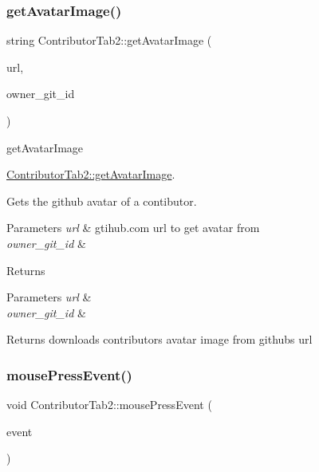 \subsubsection{\texorpdfstring{get\+Avatar\+Image()}{getAvatarImage()}}
{\footnotesize\ttfamily string Contributor\+Tab2\+::get\+Avatar\+Image (\begin{DoxyParamCaption}\item[{string}]{url,  }\item[{string}]{owner\+\_\+git\+\_\+id }\end{DoxyParamCaption})}



get\+Avatar\+Image 

\hyperlink{classContributorTab2_aed6aceb6bd6c0fb3d32e435a731133d8}{Contributor\+Tab2\+::get\+Avatar\+Image}.

Gets the github avatar of a contibutor. 
\begin{DoxyParams}{Parameters}
{\em url} & gtihub.\+com url to get avatar from \\
\hline
{\em owner\+\_\+git\+\_\+id} & \\
\hline
\end{DoxyParams}
\begin{DoxyReturn}{Returns}

\end{DoxyReturn}

\begin{DoxyParams}{Parameters}
{\em url} & \\
\hline
{\em owner\+\_\+git\+\_\+id} & \\
\hline
\end{DoxyParams}
\begin{DoxyReturn}{Returns}
downloads contributor\textquotesingle{}s avatar image from github\textquotesingle{}s url 
\end{DoxyReturn}
\mbox{\label{classContributorTab2_a93c3ed51e9f40c439ed4182e4407434a}} 
\subsubsection{\texorpdfstring{mouse\+Press\+Event()}{mousePressEvent()}}
{\footnotesize\ttfamily void Contributor\+Tab2\+::mouse\+Press\+Event (\begin{DoxyParamCaption}\item[{Q\+Mouse\+Event $\ast$}]{event }\end{DoxyParamCaption})\hspace{0.3cm}{\ttfamily [protected]}}



